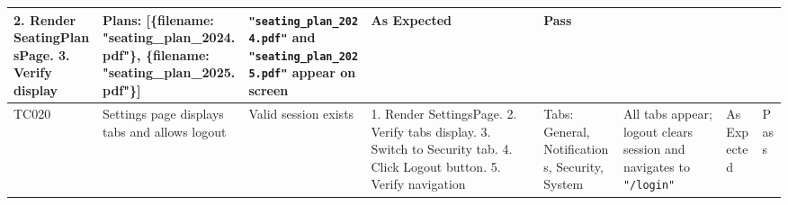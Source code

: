 \begin{table}[H]
{\begin{tabular}{|p{0.8cm}|p{1.8cm}|p{1.5cm}|p{2.5cm}|p{1.5cm}|p{2cm}|p{1.2cm}|p{0.8cm}|}
        2. Render SeatingPlansPage. 
        3. Verify display & Plans: [\{filename: "seating\_plan\_2024.pdf"\}, \{filename: "seating\_plan\_2025.pdf"\}] & \texttt{"seating\_plan\_2024.pdf"} and \texttt{"seating\_plan\_2025.pdf"} appear on screen & As Expected & Pass \\
        \hline
        TC020 & Settings page displays tabs and allows logout & Valid session exists & 1. Render SettingsPage. 
        2. Verify tabs display. 
        3. Switch to Security tab. 
        4. Click Logout button. 
        5. Verify navigation & Tabs: General, Notifications, Security, System & All tabs appear; logout clears session and navigates to \texttt{"/login"} & As Expected & Pass \\
        \hline
    \end{tabular}%
    }
\end{table}